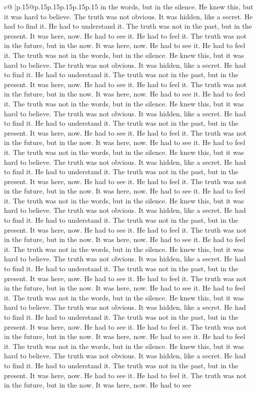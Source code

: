 \documentclass{article}
\begin{document}
{\begin{supertabular}{c@{$\;$}|p{.15\linewidth}@{}p{.15\linewidth}p{.15\linewidth}p{.15\linewidth}p{.15\linewidth}p{.15\linewidth}}
{{{in the words, but in the silence. He knew this, but it was hard to believe. The truth was not obvious. It was hidden, like a secret. He had to find it. He had to understand it. The truth was not in the past, but in the present. It was here, now. He had to see it. He had to feel it. The truth was not in the future, but in the now. It was here, now. He had to see it. He had to feel it. The truth was not in the words, but in the silence. He knew this, but it was hard to believe. The truth was not obvious. It was hidden, like a secret. He had to find it. He had to understand it. The truth was not in the past, but in the present. It was here, now. He had to see it. He had to feel it. The truth was not in the future, but in the now. It was here, now. He had to see it. He had to feel it. The truth was not in the words, but in the silence. He knew this, but it was hard to believe. The truth was not obvious. It was hidden, like a secret. He had to find it. He had to understand it. The truth was not in the past, but in the present. It was here, now. He had to see it. He had to feel it. The truth was not in the future, but in the now. It was here, now. He had to see it. He had to feel it. The truth was not in the words, but in the silence. He knew this, but it was hard to believe. The truth was not obvious. It was hidden, like a secret. He had to find it. He had to understand it. The truth was not in the past, but in the present. It was here, now. He had to see it. He had to feel it. The truth was not in the future, but in the now. It was here, now. He had to see it. He had to feel it. The truth was not in the words, but in the silence. He knew this, but it was hard to believe. The truth was not obvious. It was hidden, like a secret. He had to find it. He had to understand it. The truth was not in the past, but in the present. It was here, now. He had to see it. He had to feel it. The truth was not in the future, but in the now. It was here, now. He had to see it. He had to feel it. The truth was not in the words, but in the silence. He knew this, but it was hard to believe. The truth was not obvious. It was hidden, like a secret. He had to find it. He had to understand it. The truth was not in the past, but in the present. It was here, now. He had to see it. He had to feel it. The truth was not in the future, but in the now. It was here, now. He had to see it. He had to feel it. The truth was not in the words, but in the silence. He knew this, but it was hard to believe. The truth was not obvious. It was hidden, like a secret. He had to find it. He had to understand it. The truth was not in the past, but in the present. It was here, now. He had to see it. He had to feel it. The truth was not in the future, but in the now. It was here, now. He had to see it. He had to feel it. The truth was not in the words, but in the silence. He knew this, but it was hard to believe. The truth was not obvious. It was hidden, like a secret. He had to find it. He had to understand it. The truth was not in the past, but in the present. It was here, now. He had to see it. He had to feel it. The truth was not in the future, but in the now. It was here, now. He had to see }}}
\end{supertabular}}
\end{document}
